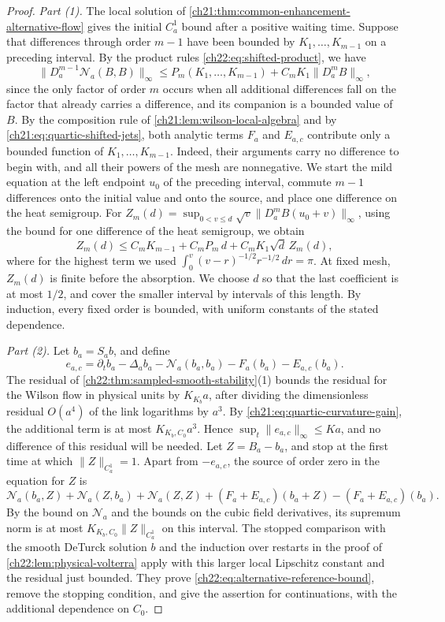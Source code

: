 \begin{proof}
\emph{Part (1).} The local solution of \cref{ch21:thm:common-enhancement-alternative-flow} gives the initial $C_a^1$ bound after a positive waiting time. Suppose that differences through order $m-1$ have been bounded by $K_1,\ldots,K_{m-1}$ on a preceding interval. By the product rules \eqref{ch22:eq:shifted-product}, we have
\[
 \|D_a^{m-1}\mathcal N_a(B,B)\|_\infty\le P_m(K_1,\ldots,K_{m-1})+C_mK_1\|D_a^mB\|_\infty ,
\]
since the only factor of order $m$ occurs when all additional differences fall on the factor that already carries a difference, and its companion is a bounded value of $B$. By the composition rule of \cref{ch21:lem:wilson-local-algebra} and by \eqref{ch21:eq:quartic-shifted-jets}, both analytic terms $F_a$ and $E_{a,c}$ contribute only a bounded function of $K_1,\ldots,K_{m-1}$. Indeed, their arguments carry no difference to begin with, and all their powers of the mesh are nonnegative. We start the mild equation at the left endpoint $u_0$ of the preceding interval, commute $m-1$ differences onto the initial value and onto the source, and place one difference on the heat semigroup. For $Z_m(d)=\sup_{0<v\le d}\sqrt v\|D_a^mB(u_0+v)\|_\infty$, using the bound for one difference of the heat semigroup, we obtain
\[
 Z_m(d)\le C_mK_{m-1}+C_mP_m\,d+C_mK_1\sqrt d\,Z_m(d),
\]
where for the highest term we used $\int_0^v(v-r)^{-1/2}r^{-1/2}\,dr=\pi$. At fixed mesh, $Z_m(d)$ is finite before the absorption. We choose $d$ so that the last coefficient is at most $1/2$, and cover the smaller interval by intervals of this length. By induction, every fixed order is bounded, with uniform constants of the stated dependence.

\emph{Part (2).} Let $b_a=S_ab$, and define
\[
 e_{a,c}=\partial_tb_a-\Delta_ab_a-\mathcal N_a(b_a,b_a)-F_a(b_a)-E_{a,c}(b_a).
\]
The residual of \cref{ch22:thm:sampled-smooth-stability}(1) bounds the residual for the Wilson flow in physical units by $K_{K_b}a$, after dividing the dimensionless residual $O(a^4)$ of the link logarithms by $a^3$. By \eqref{ch21:eq:quartic-curvature-gain}, the additional term is at most $K_{K_b,C_0}a^3$. Hence $\sup_t\|e_{a,c}\|_\infty\le Ka$, and no difference of this residual will be needed. Let $Z=B_a-b_a$, and stop at the first time at which $\|Z\|_{C_a^1}=1$. Apart from $-e_{a,c}$, the source of order zero in the equation for $Z$ is
\[
 \mathcal N_a(b_a,Z)+\mathcal N_a(Z,b_a)+\mathcal N_a(Z,Z)+(F_a+E_{a,c})(b_a+Z)-(F_a+E_{a,c})(b_a).
\]
By the bound on $\mathcal N_a$ and the bounds on the cubic field derivatives, its supremum norm is at most $K_{K_b,C_0}\|Z\|_{C_a^1}$ on this interval. The stopped comparison with the smooth DeTurck solution $b$ and the induction over restarts in the proof of \cref{ch22:lem:physical-volterra} apply with this larger local Lipschitz constant and the residual just bounded. They prove \eqref{ch22:eq:alternative-reference-bound}, remove the stopping condition, and give the assertion for continuations, with the additional dependence on $C_0$.
\end{proof}


